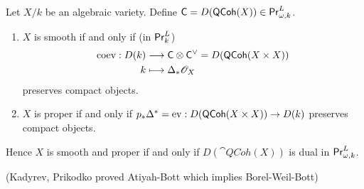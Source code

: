 \begin{theorem}[Kontsevich]
	Let $X /k$ be an algebraic variety. Define $\mathsf{C} = D(\mathsf{QCoh}(X))\in \mathsf{Pr}^L_{\omega,k}$.
	\begin{enumerate}[1)]
		\item $X$ is smooth if and only if (in $\mathsf{Pr}^L_k$)
			\begin{align*}
				\operatorname{coev}: D(k) &\longrightarrow \mathsf{C}\otimes\mathsf{C}^{\vee} = D(\mathsf{QCoh}(X\times X)) \\
				k &\longmapsto \Delta_*\mathscr{O}_X
			\end{align*}
			preserves compact objects.
		\item $X$ is proper if and only if $p_*\Delta^{*}=\ev:D(\cat{QCoh}(X\times X))\to D(k)$ preserves compact objects.
	\end{enumerate}
	Hence $X$ is smooth and proper if and only if $D(\cat{QCoh}(X))$ is dual in $\mathsf{Pr}^L_{\omega,k}$.
\end{theorem}
(Kadyrev, Prikodko proved Atiyah-Bott which implies Borel-Weil-Bott)



